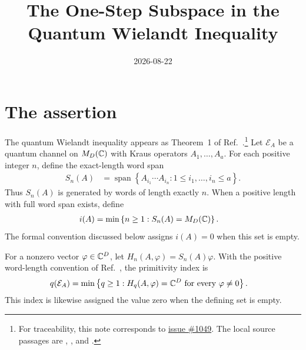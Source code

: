 \documentclass{article}
\title{The One-Step Subspace in the Quantum Wielandt Inequality}
\author{}
\date{2026-08-22}
\begin{document}
\maketitle
{}

\section{The assertion}

The quantum Wielandt inequality appears as Theorem~1 of
Ref.~\cite{Sanz2010Quantum}.\footnote{For traceability, this note corresponds
    to \href{https://github.com/LionSR/TNLean/issues/1049}{issue \#1049}. The
    local source passages are
    ,
    , and
    .}
Let $\mathcal E_A$ be a quantum channel on $M_D(\mathbb{C})$ with Kraus operators
$A_1,\ldots,A_a$. For each positive integer $n$, define the exact-length word
span
\begin{align}
    S_n(A)
        &=
        \operatorname{span}
        \left\{A_{i_1}\cdots A_{i_n}
            : 1\leq i_1,\ldots,i_n\leq a\right\}.
    \label{eq:spwc10_wielandt_one_step_subspace_exact_word_span}
\end{align}
Thus $S_n(A)$ is generated by words of length exactly $n$. When a positive
length with full word span exists, define
\begin{align}
    i(A)
        &=
        \min\left\{n\geq 1:S_n(A)=M_D(\mathbb{C})\right\}.
    \label{eq:spwc10_wielandt_one_step_subspace_i_index}
\end{align}
The formal convention discussed below assigns $i(A)=0$ when this set is empty.

For a nonzero vector $\varphi\in\mathbb{C}^D$, let
$H_n(A,\varphi)=S_n(A)\varphi$. With the positive word-length convention of
Ref.~\cite{Sanz2010Quantum}, the primitivity index is
\begin{align}
    q(\mathcal E_A)
        &=
        \min\left\{q\geq 1:
            H_q(A,\varphi)=\mathbb{C}^D
            \text{ for every }\varphi\neq 0\right\}.
    \label{eq:spwc10_wielandt_one_step_subspace_q_index}
\end{align}
This index is likewise assigned the value zero when the defining set is empty.
\end{document}
